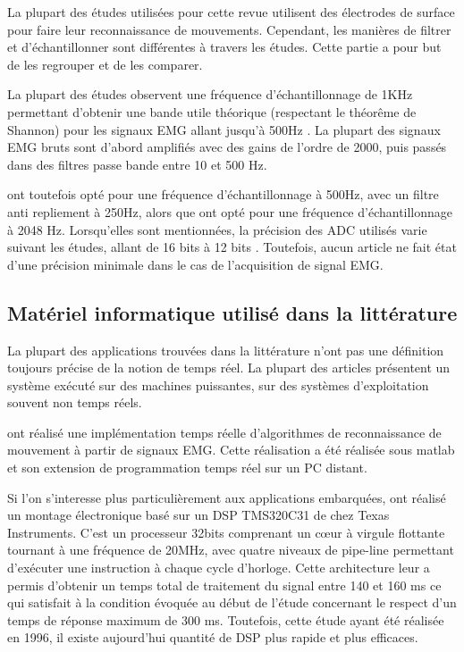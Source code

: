 \documentclass[letterpaper, twoside, 12pt, memoire, creativecommons, hyperref]{thETS}
\begin{document}
La plupart des études utilisées pour cette revue utilisent des électrodes de surface pour faire leur reconnaissance de mouvements. Cependant, les manières de filtrer et d'échantillonner sont différentes à travers les études. Cette partie a pour but de les regrouper et de les comparer. 

La plupart des études observent une fréquence d’échantillonnage de 1KHz permettant d’obtenir une bande utile théorique (respectant le théorême de Shannon) pour les signaux EMG allant jusqu’à 500Hz \citep{Chang1996, Chu2007, Englehart2003, Tenore2007}. 
La plupart des signaux EMG bruts sont d'abord amplifiés avec des gains de l’ordre de 2000, puis passés dans des filtres passe bande entre 10 et 500 Hz.

\cite{Peleg2002} ont toutefois opté pour une fréquence d’échantillonnage à 500Hz, avec un filtre anti repliement à 250Hz, alors que \cite{Crawford2005} ont opté pour une fréquence d’échantillonnage à 2048 Hz.
Lorsqu’elles sont mentionnées, la précision des ADC utilisés varie suivant les études, allant de 16 bits \citep{Englehart2003} à 12 bits \citep{Tenore2007, Fukuda2003, Prasad1996}. Toutefois, aucun article ne fait état d'une précision minimale dans le cas de l'acquisition de signal EMG.


\subsection{Matériel informatique utilisé dans la littérature}

La plupart des applications trouvées dans la littérature n'ont pas une définition toujours précise de la notion de temps réel. La plupart des articles présentent un système exécuté sur des machines puissantes, sur des systèmes d'exploitation souvent non temps réels. 

\cite{Englehart2003} ont réalisé une implémentation temps réelle d’algorithmes de reconnaissance de mouvement à partir de signaux EMG. Cette réalisation a été réalisée sous matlab et son extension de programmation temps réel sur un PC distant.

Si l'on s'interesse plus particulièrement aux applications embarquées, \cite{Chang1996} ont réalisé un montage électronique basé sur un DSP TMS320C31 de chez Texas Instruments. C’est un processeur 32bits comprenant un cœur à virgule flottante tournant à une fréquence de 20MHz, avec quatre niveaux de pipe-line permettant d’exécuter une instruction à chaque cycle d’horloge. Cette architecture leur a permis d’obtenir un temps total de traitement du signal entre 140 et 160 ms ce qui satisfait à la condition évoquée au début de l’étude concernant le respect d’un temps de réponse maximum de 300 ms. Toutefois, cette étude ayant été réalisée en 1996, il existe aujourd’hui quantité de DSP plus rapide et plus efficaces.
\end{document}
